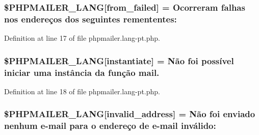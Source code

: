 \subsubsection[{\texorpdfstring{\$\+P\+H\+P\+M\+A\+I\+L\+E\+R\+\_\+\+L\+A\+NG}{$PHPMAILER_LANG}}]{\setlength{\rightskip}{0pt plus 5cm}\$P\+H\+P\+M\+A\+I\+L\+E\+R\+\_\+\+L\+A\+NG\mbox{[}\textquotesingle{}from\+\_\+failed\textquotesingle{}\mbox{]} = \textquotesingle{}Ocorreram falhas nos endereços dos seguintes remententes\+: \textquotesingle{}}\hypertarget{phpmailer_8lang-pt_8php_adf832ae12155a09be077c6d5e4fd7e22}{}\label{phpmailer_8lang-pt_8php_adf832ae12155a09be077c6d5e4fd7e22}


Definition at line 17 of file phpmailer.\+lang-\/pt.\+php.

\subsubsection[{\texorpdfstring{\$\+P\+H\+P\+M\+A\+I\+L\+E\+R\+\_\+\+L\+A\+NG}{$PHPMAILER_LANG}}]{\setlength{\rightskip}{0pt plus 5cm}\$P\+H\+P\+M\+A\+I\+L\+E\+R\+\_\+\+L\+A\+NG\mbox{[}\textquotesingle{}instantiate\textquotesingle{}\mbox{]} = \textquotesingle{}Não foi possível iniciar uma instância da função mail.\textquotesingle{}}\hypertarget{phpmailer_8lang-pt_8php_ad58dde16780f4770ccf4dd282ea1f5ad}{}\label{phpmailer_8lang-pt_8php_ad58dde16780f4770ccf4dd282ea1f5ad}


Definition at line 18 of file phpmailer.\+lang-\/pt.\+php.

\subsubsection[{\texorpdfstring{\$\+P\+H\+P\+M\+A\+I\+L\+E\+R\+\_\+\+L\+A\+NG}{$PHPMAILER_LANG}}]{\setlength{\rightskip}{0pt plus 5cm}\$P\+H\+P\+M\+A\+I\+L\+E\+R\+\_\+\+L\+A\+NG\mbox{[}\textquotesingle{}invalid\+\_\+address\textquotesingle{}\mbox{]} = \textquotesingle{}Não foi enviado nenhum {\bf e}-\/mail para {\bf o} endereço de {\bf e}-\/mail inválido\+: \textquotesingle{}}\hypertarget{phpmailer_8lang-pt_8php_a42d61bcea4c79599ecb44fd062f54d47}{}\label{phpmailer_8lang-pt_8php_a42d61bcea4c79599ecb44fd062f54d47}


